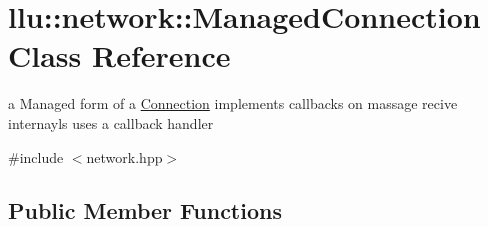 \hypertarget{classllu_1_1network_1_1_managed_connection}{\section{llu\+:\+:network\+:\+:Managed\+Connection Class Reference}
\label{classllu_1_1network_1_1_managed_connection}
}


a Managed form of a \hyperlink{classllu_1_1network_1_1_connection}{Connection} implements callbacks on massage recive internayls uses a callback handler  




{\ttfamily \#include $<$network.\+hpp$>$}

\subsection*{Public Member Functions}
